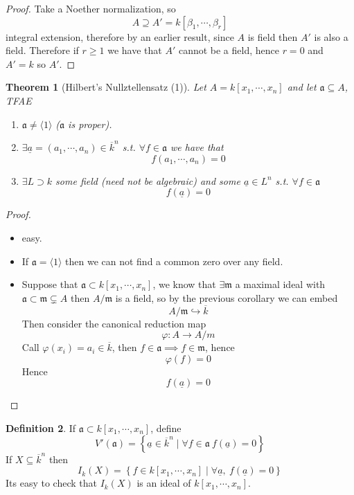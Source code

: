 \documentclass[11pt,a4paper]{article}
\theoremstyle{definition}
\newtheorem{definition}{Definition}[section]
\theoremstyle{plain}
\newtheorem{theorem}[definition]{Theorem}
\theoremstyle{remark}
\renewcommand{\set}[1]{\left\{ #1 \right\}}
\newcommand{\angles}[1]{\langle #1 \rangle}
\begin{document}
\begin{proof}
    Take a Noether normalization, so 
    $$A \supseteq A' = k[\beta_1, \cdots, \beta_r]$$
    integral extension, therefore by an earlier result, since $A$ is field then $A'$ is also a field. Therefore if $r \ge 1$ we have that 
    $A'$ cannot be a field, hence $r = 0$ and $A' = k$ so $A'$.
\end{proof}

\begin{theorem}[Hilbert's Nullztellensatz (1)]
    Let $A = k[x_1, \cdots, x_n]$ and let $\mathfrak{a} \subseteq A$, TFAE 
    \begin{enumerate}
        \item $\mathfrak{a} \ne \angles{1}$ ($\mathfrak{a}$ is proper). 
        \item $\exists \underline{a} = (a_1, \cdots, a_n) \in \overline{k}^n$ s.t. $\forall f \in \mathfrak{a}$ we have that 
        $$f (a_1, \cdots, a_n) = 0$$
        \item $\exists L \supset k$ some field (need not be algebraic) and some $\underline{a} \in L^n$ s.t. $\forall f \in \mathfrak{a}$ 
        $$f(\underline{a}) = 0$$ 
    \end{enumerate}
\end{theorem}

\begin{proof}
    \begin{itemize}
        \item[$(2) \implies (3)$] easy. 
        \item[$(3) \implies (1)$] If $\mathfrak{a} = \angles{1}$ then we can not find a common zero over any field. 
        \item[$(1) \implies (2)$] Suppose that $\mathfrak{a} \subset k[x_1, \cdots, x_n]$, we know that $\exists \mathfrak{m}$ a maximal ideal with 
        $\mathfrak{a} \subset \mathfrak{m} \subsetneq A$ then $A/\mathfrak{m}$ is a field, so by the previous corollary we can embed 
        $$A/\mathfrak{m} \hookrightarrow \overline{k}$$
        Then consider the canonical reduction map
        $$\varphi \colon A \to A/m$$
        Call $\varphi(x_i) = a_i \in \overline{k}$, then $f \in \mathfrak{a} \implies f \in \mathfrak{m}$, hence 
        $$\varphi(f) = 0$$
        Hence 
        $$f(\underline{a}) = 0$$
    \end{itemize}
\end{proof}

\begin{definition}
    If $\mathfrak{a} \subset k[x_1, \cdots, x_n]$, define 
    $$V'(\mathfrak{a}) = \set{\underline{a} \in \overline{k}^n \mid \forall f \in \mathfrak{a} \ f(\underline{a}) = 0}$$
    If $X \subseteq \overline{k}^n$ then 
    $$I_k(X) = \set{f \in k[x_1, \cdots, x_n] \mid \forall \underline{a}, \ f(\underline{a}) = 0}$$
    Its easy to check that $I_k(X)$ is an ideal of $k[x_1, \cdots, x_n]$.
\end{definition}
\end{document}
